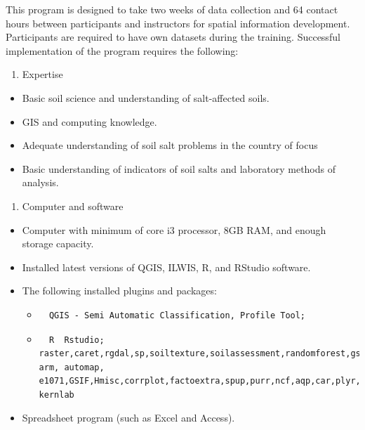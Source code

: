 \documentclass[
  10pt,
  b5paper,
]{book}
\providecommand{\tightlist}{%
  \setlength{\itemsep}{0pt}\setlength{\parskip}{0pt}}
\begin{document}
This program is designed to take two weeks of data collection and 64 contact hours between participants and instructors for spatial information development. Participants are required to have own datasets during the training.
Successful implementation of the program requires the following:

\begin{enumerate}
\def\labelenumi{\arabic{enumi})}
\tightlist
\item
  Expertise
\end{enumerate}

\begin{itemize}
\tightlist
\item
  Basic soil science and understanding of salt-affected soils.
\item
  GIS and computing knowledge.
\item
  Adequate understanding of soil salt problems in the country of focus
\item
  Basic understanding of indicators of soil salts and laboratory methods of analysis.
\end{itemize}

\begin{enumerate}
\def\labelenumi{\arabic{enumi})}
\setcounter{enumi}{1}
\tightlist
\item
  Computer and software
\end{enumerate}

\begin{itemize}
\tightlist
\item
  Computer with minimum of core i3 processor, 8GB RAM, and enough storage capacity.
\item
  Installed latest versions of QGIS, ILWIS, R, and RStudio software.
\item
  The following installed plugins and packages:

  \begin{itemize}
  \item
\begin{verbatim}
  QGIS - Semi Automatic Classification, Profile Tool;
\end{verbatim}
  \item
\begin{verbatim}
  R  Rstudio; raster,caret,rgdal,sp,soiltexture,soilassessment,randomforest,gstat, arm, automap, e1071,GSIF,Hmisc,corrplot,factoextra,spup,purr,ncf,aqp,car,plyr, kernlab
\end{verbatim}
  \end{itemize}
\item
  Spreadsheet program (such as Excel and Access).
\end{itemize}
\end{document}
